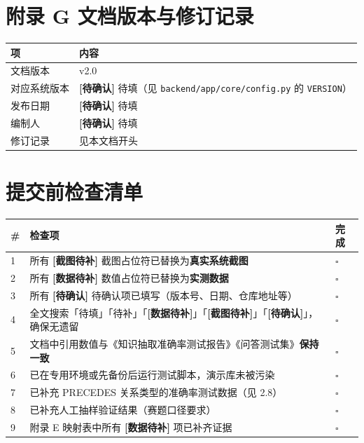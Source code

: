 \documentclass[UTF8,a4paper,11pt]{ctexrep}
\newcommand{\shotmark}{\textcolor{todobar}{\textbf{[截图待补]}}}
\newcommand{\todomark}{\textcolor{todobar}{\textbf{[数据待补]}}}
\newcommand{\verifymark}{\textcolor{todobar}{\textbf{[待确认]}}}
\begin{document}
\section*{附录 G 文档版本与修订记录}

\begin{center}
\small
\begin{tabularx}{\linewidth}{@{}XX@{}}
\toprule
项 & 内容 \\
\midrule
文档版本 & v2.0 \\
对应系统版本 & \verifymark{} 待填（见 \texttt{backend/app/core/config.py} 的 \texttt{VERSION}） \\
发布日期 & \verifymark{} 待填 \\
编制人 & \verifymark{} 待填 \\
修订记录 & 见本文档开头 \\
\bottomrule
\end{tabularx}
\end{center}

\section*{提交前检查清单}

\begin{center}
\small
\begin{tabularx}{\linewidth}{@{}XXX@{}}
\toprule
\# & 检查项 & 完成 \\
\midrule
1 & 所有 \shotmark{} 截图占位符已替换为\textbf{真实系统截图} & $\square$ \\
2 & 所有 \todomark{} 数值占位符已替换为\textbf{实测数据} & $\square$ \\
3 & 所有 \verifymark{} 待确认项已填写（版本号、日期、仓库地址等） & $\square$ \\
4 & 全文搜索「待填」「待补」「\todomark{}」「\shotmark{}」「\verifymark{}」，确保无遗留 & $\square$ \\
5 & 文档中引用数值与《知识抽取准确率测试报告》《问答测试集》\textbf{保持一致} & $\square$ \\
6 & 已在专用环境或先备份后运行测试脚本，演示库未被污染 & $\square$ \\
7 & 已补充 PRECEDES 关系类型的准确率测试数据（见 2.8） & $\square$ \\
8 & 已补充人工抽样验证结果（赛题口径要求） & $\square$ \\
9 & 附录 E 映射表中所有 \todomark{} 项已补齐证据 & $\square$ \\
\bottomrule
\end{tabularx}
\end{center}
\end{document}
